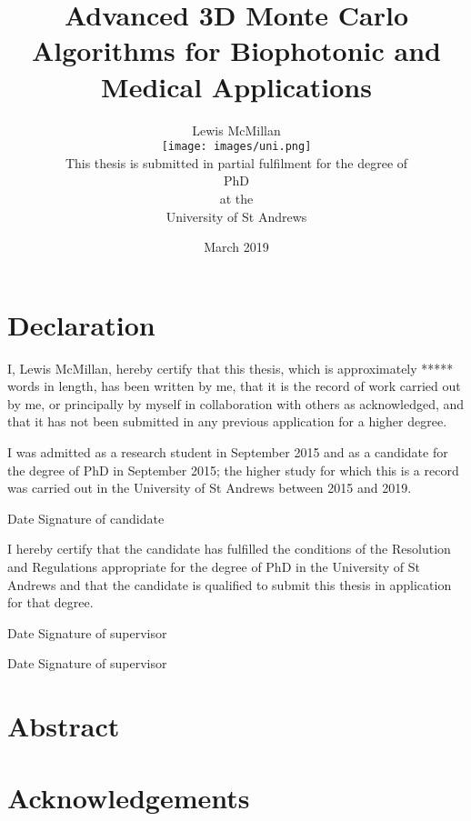 \documentclass[10pt,a4paper,twoside]{book}
\title{Advanced 3D Monte Carlo Algorithms for Biophotonic and Medical Applications}
\author{\Large Lewis McMillan\\
\texttt{[image: images/uni.png]}\\
This thesis is submitted in partial fulfilment for the degree of \\
PhD\\ 
at the \\
University of St Andrews}
\date{March 2019}
\begin{document}
\frontmatter%

\maketitle
{}%

\chapter{Declaration}
I, Lewis McMillan, hereby certify that this thesis, which is approximately ***** words in length,
has been written by me, that it is the record of work carried out by me, or principally by myself in collaboration with others as acknowledged, and that it has not been submitted in any
previous application for a higher degree.
\medskip

I was admitted as a research student in September 2015 and as a candidate for the degree
of PhD in September 2015; the higher study for which this is a record was carried out in the
University of St Andrews between 2015 and 2019.

\medskip

Date\dotfill \hspace{1cm} Signature of candidate \dotfill

\medskip

I hereby certify that the candidate has fulfilled the conditions of the Resolution and Regulations appropriate for the degree of PhD in the University of St Andrews and that the candidate
is qualified to submit this thesis in application for that degree.

\medskip

Date\dotfill \hspace{1cm} Signature of supervisor \dotfill

\medskip

\indent Date\dotfill \hspace{1cm} Signature of supervisor \dotfill

\chapter{Abstract}
\lipsum[1-2]

\chapter{Acknowledgements}
\lipsum[1-2]
\newpage

\end{document}
